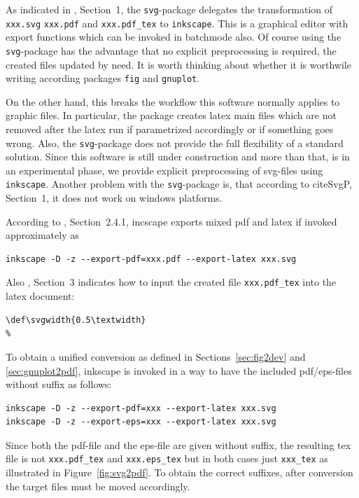\documentclass[12pt]{book}
\begin{document}
As indicated in \cite{SvgP}, Section~1, 
the \texttt{svg}-package delegates the transformation 
of \texttt{xxx.svg} \texttt{xxx.pdf} and \texttt{xxx.pdf\_tex} 
to \texttt{inkscape}. 
This is a graphical editor with export functions 
which can be invoked in batchmode also. 
Of course using the \texttt{svg}-package has the advantage 
that no explicit preprocessing is required, 
the created files updated by need. 
It is worth thinking about whether it is worthwile 
writing according packages \texttt{fig} and \texttt{gnuplot}. 

On the other hand, 
this breaks the workflow this software normally applies to graphic files. 
In particular, the package creates latex main files 
which are not removed after the latex run 
if parametrized accordingly or if something goes wrong. 
Also, the \texttt{svg}-package does not provide the full flexibility 
of a standard solution. 
Since this software is still under construction 
and more than that, is in an experimental phase, 
we provide explicit preprocessing of svg-files using \texttt{inkscape}. 
Another problem with the \texttt{svg}-package is, 
that according to cite{SvgP}, Section~1, 
it does not work on windows platforms. 


According to \cite{SvgIncl}, Section~2.4.1, 
incscape exports mixed pdf and latex if invoked approximately as 
%
\begin{Verbatim}[fontsize=\normalsize]
inkscape -D -z --export-pdf=xxx.pdf --export-latex xxx.svg 
\end{Verbatim} 
%
Also \cite{SvgIncl}, Section~3 indicates how to input the created file 
\texttt{xxx.pdf\_tex} into the latex document: 
%
\begin{verbatim}
\def\svgwidth{0.5\textwidth}
%
\end{verbatim}

To obtain a unified conversion as defined in Sections~\ref{sec:fig2dev} 
and \ref{sec:gnuplot2pdf}, 
inkscape is invoked in a way to have the included pdf/eps-files 
without suffix as follows: 
%
\begin{Verbatim}[fontsize=\normalsize]
inkscape -D -z --export-pdf=xxx --export-latex xxx.svg 
inkscape -D -z --export-eps=xxx --export-latex xxx.svg 
\end{Verbatim} 

Since both the pdf-file and the eps-file are given without suffix, 
the resulting tex file is not \texttt{xxx.pdf\_tex} and \texttt{xxx.eps\_tex} 
but in both cases just \texttt{xxx\_tex} 
as illustrated in Figure~\ref{fig:svg2pdf}. 
To obtain the correct suffixes, 
after conversion the target files must be moved accordingly. 
\end{document}
